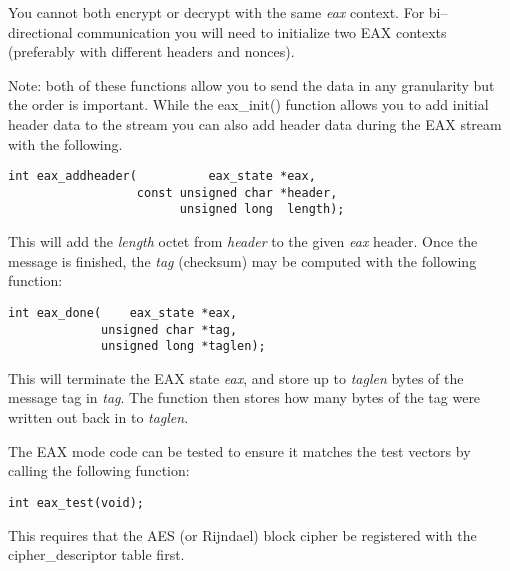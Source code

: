 \documentclass[synpaper]{book}
\begin{document}
You cannot both encrypt or decrypt with the same \textit{eax} context.  For bi--directional communication you will need to initialize 
two EAX contexts (preferably with different headers and nonces).  

Note: both of these functions allow you to send the data in any granularity but the order is important.  While
the eax\_init() function allows you to add initial header data to the stream you can also add header data during the
EAX stream with the following.

\begin{verbatim}
int eax_addheader(          eax_state *eax, 
                  const unsigned char *header, 
                        unsigned long  length);
\end{verbatim}
This will add the \textit{length} octet from \textit{header} to the given \textit{eax} header.  Once the message is finished, the 
\textit{tag} (checksum) may be computed with the following function:

\begin{verbatim}
int eax_done(    eax_state *eax, 
             unsigned char *tag, 
             unsigned long *taglen);
\end{verbatim}
This will terminate the EAX state \textit{eax}, and store up to \textit{taglen} bytes of the message tag in \textit{tag}.  The function
then stores how many bytes of the tag were written out back in to \textit{taglen}.

The EAX mode code can be tested to ensure it matches the test vectors by calling the following function:
\begin{verbatim}
int eax_test(void);
\end{verbatim}
This requires that the AES (or Rijndael) block cipher be registered with the cipher\_descriptor table first.
\end{document}
